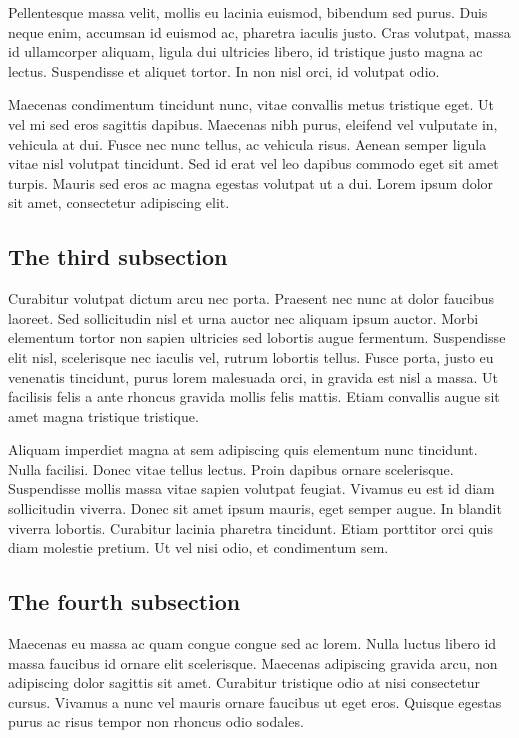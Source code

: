 Pellentesque massa velit, mollis eu lacinia euismod, bibendum sed purus. Duis neque enim, accumsan id euismod ac, pharetra iaculis justo. Cras volutpat, massa id ullamcorper aliquam, ligula dui ultricies libero, id tristique justo magna ac lectus. Suspendisse et aliquet tortor. In non nisl orci, id volutpat odio. 

Maecenas condimentum tincidunt nunc, vitae convallis metus tristique eget. Ut vel mi sed eros sagittis dapibus. Maecenas nibh purus, eleifend vel vulputate in, vehicula at dui. Fusce nec nunc tellus, ac vehicula risus. Aenean semper ligula vitae nisl volutpat tincidunt. Sed id erat vel leo dapibus commodo eget sit amet turpis. Mauris sed eros ac magna egestas volutpat ut a dui. Lorem ipsum dolor sit amet, consectetur adipiscing elit.

\subsection{The third subsection}
\label{ch7:first:c}
Curabitur volutpat dictum arcu nec porta. Praesent nec nunc at dolor faucibus laoreet. Sed sollicitudin nisl et urna auctor nec aliquam ipsum auctor. Morbi elementum tortor non sapien ultricies sed lobortis augue fermentum. Suspendisse elit nisl, scelerisque nec iaculis vel, rutrum lobortis tellus. Fusce porta, justo eu venenatis tincidunt, purus lorem malesuada orci, in gravida est nisl a massa. Ut facilisis felis a ante rhoncus gravida mollis felis mattis. Etiam convallis augue sit amet magna tristique tristique. 

Aliquam imperdiet magna at sem adipiscing quis elementum nunc tincidunt. Nulla facilisi. Donec vitae tellus lectus. Proin dapibus ornare scelerisque. Suspendisse mollis massa vitae sapien volutpat feugiat. Vivamus eu est id diam sollicitudin viverra. Donec sit amet ipsum mauris, eget semper augue. In blandit viverra lobortis. Curabitur lacinia pharetra tincidunt. Etiam porttitor orci quis diam molestie pretium. Ut vel nisi odio, et condimentum sem.

\subsection{The fourth subsection}
\label{ch7:first:d}
Maecenas eu massa ac quam congue congue sed ac lorem. Nulla luctus libero id massa faucibus id ornare elit scelerisque. Maecenas adipiscing gravida arcu, non adipiscing dolor sagittis sit amet. Curabitur tristique odio at nisi consectetur cursus. Vivamus a nunc vel mauris ornare faucibus ut eget eros. Quisque egestas purus ac risus tempor non rhoncus odio sodales. 


